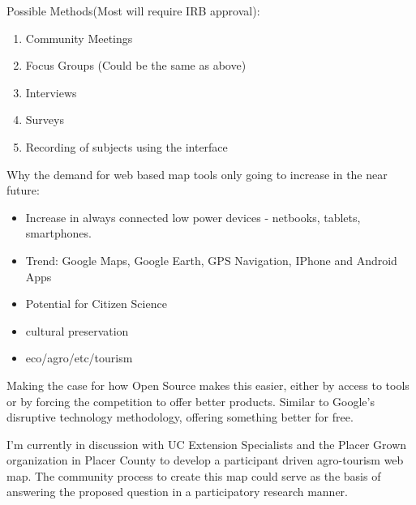 \documentclass[12pt,letterpaper]{article}
\begin{document}
Possible Methods(Most will require IRB approval):
\begin{enumerate}
\item Community Meetings
\item Focus Groups (Could be the same as above)
\item Interviews
\item Surveys
\item Recording of subjects using the interface
\end{enumerate}


Why the demand for web based map tools only going to increase in the near future:
\begin{itemize}
\item Increase in always connected low power devices - netbooks, tablets, smartphones.
\item Trend: Google Maps, Google Earth, GPS Navigation, IPhone and Android Apps  
\end{itemize} 
\begin{itemize}
\item Potential for Citizen Science
\item cultural preservation
\item eco/agro/etc/tourism
\end{itemize} 

Making the case for how Open Source makes this easier, either by access to tools or by forcing the competition to offer better products. Similar to Google's disruptive technology methodology, offering something better for free.

I'm currently in discussion with UC Extension Specialists and the Placer Grown organization in Placer County to develop a participant driven agro-tourism web map. The community process to create this map could serve as the basis of answering the proposed question in a participatory research manner.
\end{document}
